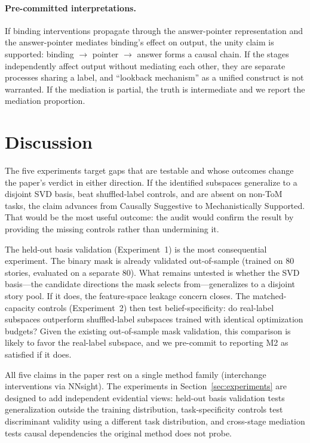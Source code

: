 \documentclass[11pt]{article}
\begin{document}
\paragraph{Pre-committed interpretations.} If binding interventions propagate through the answer-pointer representation and the answer-pointer mediates binding's effect on output, the unity claim is supported: binding $\to$ pointer $\to$ answer forms a causal chain. If the stages independently affect output without mediating each other, they are separate processes sharing a label, and ``lookback mechanism'' as a unified construct is not warranted. If the mediation is partial, the truth is intermediate and we report the mediation proportion.


\section{Discussion}
\label{sec:discussion}

The five experiments target gaps that are testable and whose outcomes change the paper's verdict in either direction. If the identified subspaces generalize to a disjoint SVD basis, beat shuffled-label controls, and are absent on non-ToM tasks, the claim advances from Causally Suggestive to Mechanistically Supported. That would be the most useful outcome: the audit would confirm the result by providing the missing controls rather than undermining it.

The held-out basis validation (Experiment~1) is the most consequential experiment. The binary mask is already validated out-of-sample (trained on 80 stories, evaluated on a separate 80). What remains untested is whether the SVD basis---the candidate directions the mask selects from---generalizes to a disjoint story pool. If it does, the feature-space leakage concern closes. The matched-capacity controls (Experiment~2) then test belief-specificity: do real-label subspaces outperform shuffled-label subspaces trained with identical optimization budgets? Given the existing out-of-sample mask validation, this comparison is likely to favor the real-label subspace, and we pre-commit to reporting M2 as satisfied if it does.

All five claims in the paper rest on a single method family (interchange interventions via NNsight). The experiments in Section~\ref{sec:experiments} are designed to add independent evidential views: held-out basis validation tests generalization outside the training distribution, task-specificity controls test discriminant validity using a different task distribution, and cross-stage mediation tests causal dependencies the original method does not probe.
\end{document}

